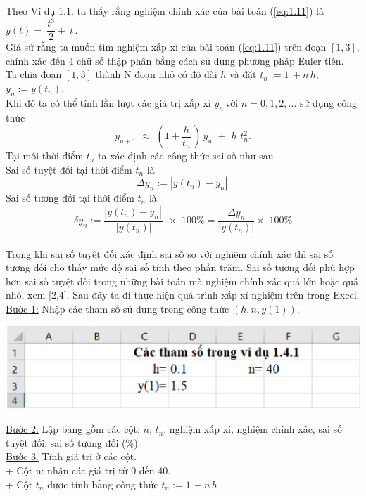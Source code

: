 Theo Ví dụ 1.1. ta thấy rằng nghiệm chính xác của bài toán (\ref{eq:1.11}) là $y(t)=~\dfrac{{{t}^{3}}}{2}+~t\,.$\\
Giả sử rằng ta muốn tìm nghiệm xấp xỉ của bài toán (\ref{eq:1.11}) trên đoạn $[1,3]$, chính xác đến $4$ chữ số thập phân bằng cách sử dụng phương pháp Euler tiến. \\
Ta chia đoạn $[1,3]$ thành N đoạn nhỏ có độ dài $h$ và đặt ${{t}_{n}}:=1\,+n\,h$, ${{y}_{n}}:=y({{t}_{n}}).$ \\
Khi đó ta có thể tính lần lượt các giá trị xấp xỉ  ${{y}_{n}}\,$với $n=0,1,2,...$ sử dụng công thức
\[{{y}_{n+1}}\,\,\approx \,\,(1+\dfrac{h}{{{t}_{n}}}\,)\,{{y}_{n}}\,\,+\,\,h\,\,t_{n}^{2}.\]
Tại mỗi thời điểm ${{t}_{n}}$ ta xác định các công thức sai số như sau\\ 
Sai số tuyệt đối  tại thời điểm ${{t}_{n}}$ là  $$\Delta {{y}_{n}}:=\left| y({{t}_{n}})-{{y}_{n}} \right|\,$$ 
Sai số tương đối  tại thời điểm ${{t}_{n}}$ là \\ $$\delta {{y}_{n}}:=\dfrac{\left| y({{t}_{n}})-{{y}_{n}} \right|\,}{\left| y({{t}_{n}}) \right|}\,\,\times \,\,100\%=\dfrac{\Delta {{y}_{n}}}{\left| y({{t}_{n}}) \right|}\times \,\,100\% $$\\
Trong khi sai số tuyệt đối xác định sai số so với nghiệm chính xác thì sai số tương đối cho thấy mức độ sai số tính theo phần trăm. Sai số tương đối phù hợp hơn sai số tuyệt đối trong những bài toán mà nghiệm chính xác quá lớn hoặc quá nhỏ, xem [2,4]. Sau đây ta đi thực hiện quá trình xấp xỉ nghiệm trên trong Excel.\newpage
\noindent \underline{Bước 1:} Nhập các tham số sử dụng trong công thức $(h, n, y(1)).$
\begin{center}
	\includegraphics[scale=0.6]{Images/cac_tham_so_trong_vidu_1_4_1}
\end{center}
\underline{Bước 2:} Lập bảng gồm các cột: $n$, ${{t}_{n}}$, nghiệm xấp xỉ, nghiệm chính xác, sai số tuyệt đối, sai số tương đối (\%). \\
\underline{Bước 3.} Tính giá trị ở các cột.\\
+ Cột n: nhận các giá trị từ $0$ đến $40$.\\
+ Cột ${{t}_{n}}$ được tính bằng công thức ${{t}_{n}}:=1\,+n\,h$
